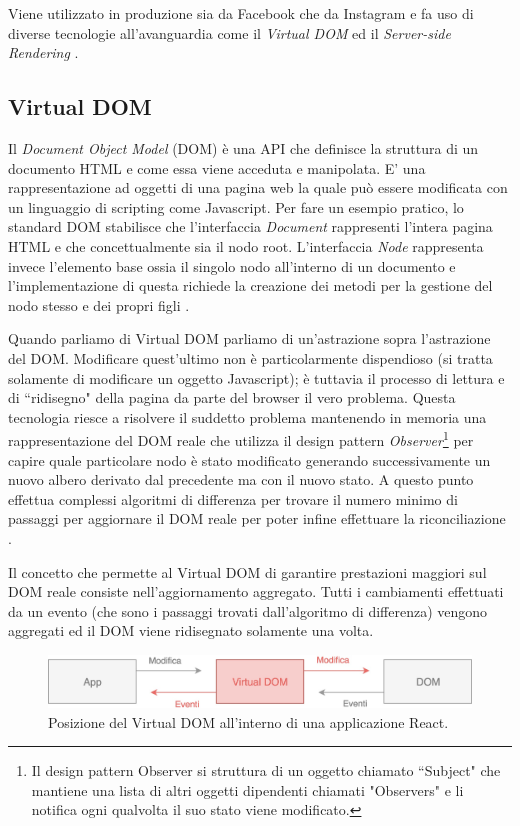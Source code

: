 \noindent
Viene utilizzato in produzione sia da Facebook che da Instagram e fa uso di diverse tecnologie all'avanguardia come il \textit{Virtual DOM} ed il \textit{Server-side Rendering} \cite{WheelerOnReact}.

\subsection{Virtual DOM}
Il  \textit{Document Object Model} (DOM) è una API che definisce la struttura di un documento HTML e come essa viene acceduta e manipolata. E' una rappresentazione ad oggetti di una pagina web la quale può essere modificata con un linguaggio di scripting come Javascript.
Per fare un esempio pratico, lo standard DOM stabilisce che l'interfaccia \textit{Document} rappresenti l'intera pagina HTML e che concettualmente sia il nodo root. L'interfaccia \textit{Node} rappresenta invece l'elemento base ossia il singolo nodo all'interno di un documento e l'implementazione di questa richiede la creazione dei metodi per la gestione del nodo stesso e dei propri figli \cite{HWRWhatIsDOM}.

Quando parliamo di Virtual DOM parliamo di un'astrazione sopra l'astrazione del DOM. Modificare quest'ultimo non è particolarmente dispendioso (si tratta solamente di modificare un oggetto Javascript); è tuttavia il processo di lettura e di “ridisegno" della pagina da parte del browser il vero problema. Questa tecnologia riesce a risolvere il suddetto problema mantenendo in memoria una rappresentazione del DOM reale che utilizza il design pattern \textit{Observer}\footnote{Il design pattern Observer si struttura di un oggetto chiamato “Subject" che mantiene una lista di altri oggetti dipendenti chiamati "Observers" e li notifica ogni qualvolta il suo stato viene modificato.} per capire quale particolare nodo è stato modificato generando successivamente un nuovo albero derivato dal precedente ma con il nuovo stato. A questo punto effettua complessi algoritmi di differenza per trovare il numero minimo di passaggi per aggiornare il DOM reale per poter infine effettuare la riconciliazione \cite{MishraOnVirtualDOM}.

Il concetto che permette al Virtual DOM di garantire prestazioni maggiori sul DOM reale consiste nell'aggiornamento aggregato. Tutti i cambiamenti effettuati da un evento (che sono i passaggi trovati dall'algoritmo di differenza) vengono aggregati ed il DOM viene ridisegnato solamente una volta.

\begin{figure}[h]
\centering 
\vspace*{0.5cm}
\includegraphics[width=13cm]{./images/virtualDOMWorkflow}
\caption{Posizione del Virtual DOM all'interno di una applicazione React.}
\vspace*{0.5cm}
\end{figure}

